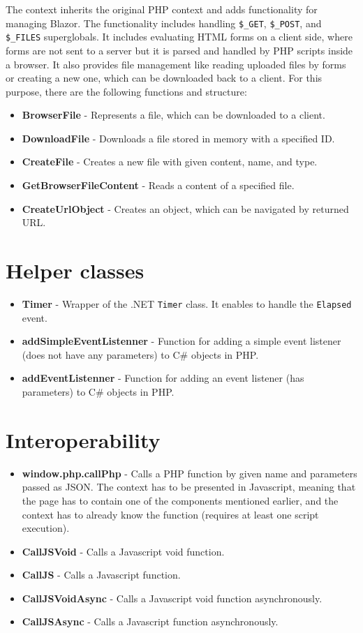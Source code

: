 The context inherits the original PHP context and adds functionality for managing Blazor. The  functionality includes handling \texttt{\$\_GET}, \texttt{\$\_POST}, and \texttt{\$\_FILES} superglobals. It includes evaluating HTML forms on a client side, where forms are not sent to a server but it is parsed and handled by PHP scripts inside a browser. It also provides file management like reading uploaded files by forms or creating a new one, which can be downloaded back to a client.  For this purpose, there are the following functions and structure:
\par
\begin{itemize}
\item \textbf{BrowserFile} - Represents a file, which can be downloaded to a client.
\item \textbf{DownloadFile} - Downloads a file stored in memory with a specified ID.
\item \textbf{CreateFile} - Creates a new file with given content, name, and type.
\item \textbf{GetBrowserFileContent} - Reads a content of a specified file.
\item \textbf{CreateUrlObject} - Creates an object, which can be navigated by returned URL.
\end{itemize}

\section{Helper classes}

\begin{itemize}
\item \textbf{Timer} - Wrapper of the .NET \texttt{Timer} class. It enables to handle the \texttt{Elapsed} event.
\item \textbf{addSimpleEventListenner} - Function for adding a simple event listener (does not have any parameters) to C\# objects in PHP.
\item \textbf{addEventListenner} - Function for adding an event listener (has parameters) to C\# objects in PHP.
\end{itemize}

\section{Interoperability}

\begin{itemize}
\item \textbf{window.php.callPhp} - Calls a PHP function by given name and parameters passed as JSON. The context has to be presented in Javascript, meaning that the page has to contain one of the components mentioned earlier, and the context has to already know the function (requires at least one script execution).
\item \textbf{CallJSVoid} - Calls a Javascript void function.
\item \textbf{CallJS} - Calls a Javascript function.
\item \textbf{CallJSVoidAsync} - Calls a Javascript void function asynchronously.
\item \textbf{CallJSAsync} - Calls a Javascript function asynchronously.
\end{itemize}

